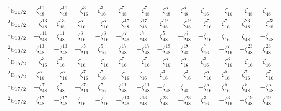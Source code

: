 \documentclass[10pt,a4paper]{article}
\numberwithin{equation}{section}
\newcommand{\irr}[1]{\text{\normalfont\scshape #1}}
\newcommand{\conjpair}[1]{{}^{#1}}
\newcommand{\rootunity}[1]{\zeta_{#1}}
\begin{document}
{\begin{longtable}{@{}lcccccccccccc@{}}
$\conjpair{1}\irr{e}_{11/2}$ & $\rootunity{48}^{11}$ & $-\rootunity{48}^{11}$ & $-\rootunity{16}^{3}$ & $\rootunity{16}^{3}$ & $\rootunity{48}^{7}$ & $-\rootunity{48}^{7}$ & $-\rootunity{48}^{5}$ & $\rootunity{48}^{5}$ & $\rootunity{16}$ & $-\rootunity{16}$ & $-\rootunity{48}$ & $\rootunity{48}$\\
$\conjpair{2}\irr{e}_{11/2}$ & $-\rootunity{48}^{13}$ & $\rootunity{48}^{13}$ & $\rootunity{16}^{5}$ & $-\rootunity{16}^{5}$ & $-\rootunity{48}^{17}$ & $\rootunity{48}^{17}$ & $\rootunity{48}^{19}$ & $-\rootunity{48}^{19}$ & $-\rootunity{16}^{7}$ & $\rootunity{16}^{7}$ & $\rootunity{48}^{23}$ & $-\rootunity{48}^{23}$\\
$\conjpair{1}\irr{e}_{13/2}$ & $-\rootunity{48}^{11}$ & $\rootunity{48}^{11}$ & $\rootunity{16}^{3}$ & $-\rootunity{16}^{3}$ & $-\rootunity{48}^{7}$ & $\rootunity{48}^{7}$ & $\rootunity{48}^{5}$ & $-\rootunity{48}^{5}$ & $-\rootunity{16}$ & $\rootunity{16}$ & $\rootunity{48}$ & $-\rootunity{48}$\\
$\conjpair{2}\irr{e}_{13/2}$ & $\rootunity{48}^{13}$ & $-\rootunity{48}^{13}$ & $-\rootunity{16}^{5}$ & $\rootunity{16}^{5}$ & $\rootunity{48}^{17}$ & $-\rootunity{48}^{17}$ & $-\rootunity{48}^{19}$ & $\rootunity{48}^{19}$ & $\rootunity{16}^{7}$ & $-\rootunity{16}^{7}$ & $-\rootunity{48}^{23}$ & $\rootunity{48}^{23}$\\
$\conjpair{1}\irr{e}_{15/2}$ & $-\rootunity{16}^{3}$ & $\rootunity{16}^{3}$ & $\rootunity{16}$ & $-\rootunity{16}$ & $\rootunity{16}^{7}$ & $-\rootunity{16}^{7}$ & $-\rootunity{16}^{5}$ & $\rootunity{16}^{5}$ & $\rootunity{16}^{3}$ & $-\rootunity{16}^{3}$ & $-\rootunity{16}$ & $\rootunity{16}$\\
$\conjpair{2}\irr{e}_{15/2}$ & $\rootunity{16}^{5}$ & $-\rootunity{16}^{5}$ & $-\rootunity{16}^{7}$ & $\rootunity{16}^{7}$ & $-\rootunity{16}$ & $\rootunity{16}$ & $\rootunity{16}^{3}$ & $-\rootunity{16}^{3}$ & $-\rootunity{16}^{5}$ & $\rootunity{16}^{5}$ & $\rootunity{16}^{7}$ & $-\rootunity{16}^{7}$\\
$\conjpair{1}\irr{e}_{17/2}$ & $-\rootunity{48}^{7}$ & $\rootunity{48}^{7}$ & $-\rootunity{16}^{7}$ & $\rootunity{16}^{7}$ & $\rootunity{48}^{11}$ & $-\rootunity{48}^{11}$ & $-\rootunity{48}$ & $\rootunity{48}$ & $-\rootunity{16}^{5}$ & $\rootunity{16}^{5}$ & $\rootunity{48}^{5}$ & $-\rootunity{48}^{5}$\\
$\conjpair{2}\irr{e}_{17/2}$ & $\rootunity{48}^{17}$ & $-\rootunity{48}^{17}$ & $\rootunity{16}$ & $-\rootunity{16}$ & $-\rootunity{48}^{13}$ & $\rootunity{48}^{13}$ & $\rootunity{48}^{23}$ & $-\rootunity{48}^{23}$ & $\rootunity{16}^{3}$ & $-\rootunity{16}^{3}$ & $-\rootunity{48}^{19}$ & $\rootunity{48}^{19}$\\

\end{longtable}}
\end{document}
